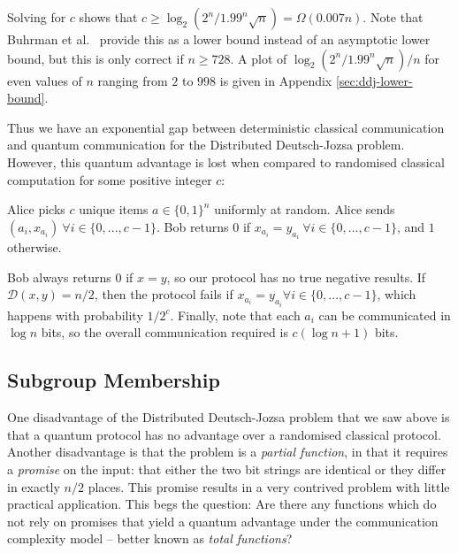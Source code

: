 \documentclass[a4paper]{article}
\begin{document}
        Solving for $c$ shows that $c \geq \log_2(2^n/1.99^n\sqrt{n}) = \Omega(0.007n)$. Note that Buhrman et al.~\cite{RevModPhys.82.665} provide this as a lower bound instead of an asymptotic lower bound, but this is only correct if $n \geq 728$. A plot of $\log_2(2^n/1.99^n\sqrt{n})/n$ for even values of $n$ ranging from $2$ to $998$ is given in Appendix \ref{sec:ddj-lower-bound}.

        Thus we have an exponential gap between deterministic classical communication and quantum communication for the Distributed Deutsch-Jozsa problem. However, this quantum advantage is lost when compared to randomised classical computation for some positive integer $c$:

        \begin{codebox}
            \li Alice picks $c$ unique items $a \in \{0, 1\}^n$ uniformly at random.
            \li Alice sends $(a_i, x_{a_i})~ \forall i \in \{0,...,c-1\}$.
            \li Bob returns $0$ if $x_{a_i} = y_{a_i}~ \forall i \in \{0,...,c-1\}$, and $1$ otherwise.
            \End
        \end{codebox}

        Bob always returns $0$ if $x = y$, so our protocol has no true negative results. If $\mathcal{D}(x, y) = n/2$, then the protocol fails if $x_{a_i} = y_{a_i} \forall i \in \{0,...,c-1\}$, which happens with probability $1/2^c$. Finally, note that each $a_i$ can be communicated in $\log n$ bits, so the overall communication required is $c(\log n + 1)$ bits.

        \subsection{Subgroup Membership}
        \label{sec:subgroup-membership}

        One disadvantage of the Distributed Deutsch-Jozsa problem that we saw above is that a quantum protocol has no advantage over a randomised classical protocol. Another disadvantage is that the problem is a {\em partial function}, in that it requires a {\em promise} on the input: that either the two bit strings are identical or they differ in exactly $n/2$ places. This promise results in a very contrived problem with little practical application. This begs the question: Are there any functions which do not rely on promises that yield a quantum advantage under the communication complexity model -- better known as {\em total functions}?
\end{document}
